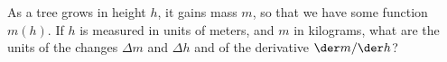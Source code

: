 As a tree grows in height $h$, it gains mass $m$, so that
we have some function $m(h)$. If $h$ is measured in units of meters,
and $m$ in kilograms, what are the units of the changes
$\Delta m$ and $\Delta h$ and of the derivative
$\der m/\der h$?
